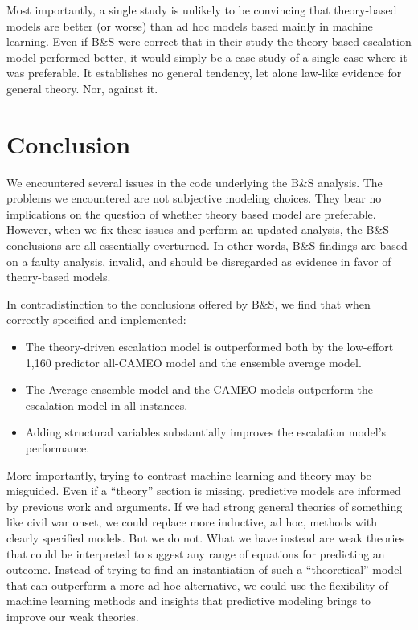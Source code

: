 \documentclass[
]{article}
\providecommand{\tightlist}{%
  \setlength{\itemsep}{0pt}\setlength{\parskip}{0pt}}
\begin{document}
Most importantly, a single study is unlikely to be convincing that theory-based models are better (or worse) than ad hoc models based mainly in machine learning. Even if B\&S were correct that in their study the theory based escalation model performed better, it would simply be a case study of a single case where it was preferable. It establishes no general tendency, let alone law-like evidence for general theory. Nor, against it.

\hypertarget{conclusion}{%
\section{Conclusion}\label{conclusion}}

We encountered several issues in the code underlying the B\&S analysis. The problems we encountered are not subjective modeling choices. They bear no implications on the question of whether theory based model are preferable. However, when we fix these issues and perform an updated analysis, the B\&S conclusions are all essentially overturned. In other words, B\&S findings are based on a faulty analysis, invalid, and should be disregarded as evidence in favor of theory-based models.

In contradistinction to the conclusions offered by B\&S, we find that when correctly specified and implemented:

\begin{itemize}
\tightlist
\item
  The theory-driven escalation model is outperformed both by the low-effort 1,160 predictor all-CAMEO model and the ensemble average model.
\item
  The Average ensemble model and the CAMEO models outperform the escalation model in all instances.
\item
  Adding structural variables substantially improves the escalation model's performance.
\end{itemize}

More importantly, trying to contrast machine learning and theory may be misguided. Even if a ``theory'' section is missing, predictive models are informed by previous work and arguments. If we had strong general theories of something like civil war onset, we could replace more inductive, ad hoc, methods with clearly specified models. But we do not. What we have instead are weak theories that could be interpreted to suggest any range of equations for predicting an outcome. Instead of trying to find an instantiation of such a ``theoretical'' model that can outperform a more ad hoc alternative, we could use the flexibility of machine learning methods and insights that predictive modeling brings to improve our weak theories.
\end{document}
